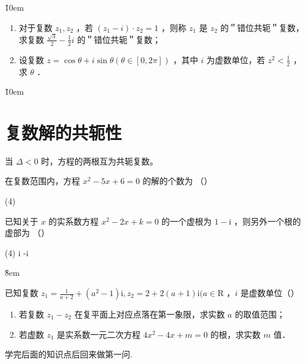 \v{10em}

\begin{example}
    \begin{enumerate}
        \item 对于复数 $z_1, z_2$ ，若 $\left(z_1-i\right) \cdot z_2=1$ ，则称 $z_1$ 是 $z_2$ 的＂错位共轭＂复数，求复数 $\frac{\sqrt{3}}{2}-\frac{1}{2} i$ 的＂错位共轭＂复数；
        \item 设复数 $z=\cos \theta+i \sin \theta(\theta \in[0,2 \pi])$ ，其中 $i$ 为虚数单位，若 $z^2<\frac{1}{2}$ ，求 $\theta$ ．
    \end{enumerate}
\end{example}

\v{10em}

\section{复数解的共轭性}

\begin{theorem}[两根的共轭性]
    当 $\Delta < 0$ 时，方程的两根互为共轭复数。
\end{theorem}

\begin{example}
    在复数范围内，方程 $x^2-5 x+6=0$ 的解的个数为 （\qquad）
    \begin{tasks}(4)
    \end{tasks}
\end{example}
\begin{example}
    已知关于 $x$ 的实系数方程 $x^2-2 x+k=0$ 的一个虚根为 $1-\mathrm{i}$ ，则另外一个根的虚部为 （\qquad）
    \begin{tasks}(4)
        \task i
        \task -i
    \end{tasks}
\end{example}

\v{8em}

\begin{example}
    已知复数 $z_1=\frac{1}{a+2}+\left(a^2-1\right) \mathrm{i}, z_2=2+2(a+1) \mathrm{i}(a \in \mathrm{R}$ ，$i$ 是虚数单位（\quad）
    \begin{enumerate}
        \item 若复数 $z_1-z_2$ 在复平面上对应点落在第一象限，求实数 $a$ 的取值范围；
        \item 若虚数 $z_1$ 是实系数一元二次方程 $4 x^2-4 x+m=0$ 的根，求实数 $m$ 值．
    \end{enumerate}

    \begin{tips}
        学完后面的知识点后回来做第一问.
    \end{tips}
\end{example}

